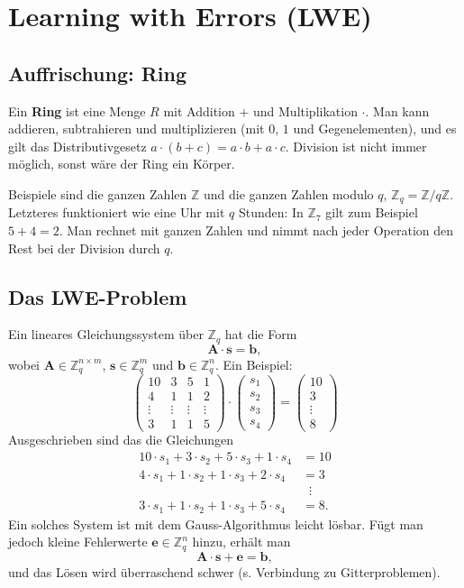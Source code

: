 \chapter{Learning with Errors (LWE)}\label{ch:lwe}

\section{Auffrischung: Ring}
Ein \textbf{Ring} ist eine Menge $R$ mit Addition $+$ und Multiplikation $\cdot$. Man kann addieren, subtrahieren und multiplizieren (mit $0$, $1$ und Gegenelementen), und es gilt das Distributivgesetz $a \cdot (b + c) = a \cdot b + a \cdot c$. Division ist nicht immer möglich, sonst wäre der Ring ein Körper.

Beispiele sind die ganzen Zahlen $\mathbb{Z}$ und die ganzen Zahlen modulo $q$, $\mathbb{Z}_q = \mathbb{Z}/q\mathbb{Z}$. Letzteres funktioniert wie eine Uhr mit $q$ Stunden: In $\mathbb{Z}_7$ gilt zum Beispiel $5 + 4 = 2$. Man rechnet mit ganzen Zahlen und nimmt nach jeder Operation den Rest bei der Division durch $q$.

\section{Das LWE-Problem}
Ein lineares Gleichungssystem über $\mathbb{Z}_q$ hat die Form
\[
    \mathbf{A} \cdot \mathbf{s} = \mathbf{b},
\]
wobei $\mathbf{A} \in \mathbb{Z}_q^{n \times m}$, $\mathbf{s} \in \mathbb{Z}_q^{m}$ und $\mathbf{b} \in \mathbb{Z}_q^{n}$. Ein Beispiel:
\[
    \begin{pmatrix}
        10 & 3 & 5 & 1 \\
        4  & 1 & 1 & 2 \\
        \vdots & \vdots & \vdots & \vdots \\
        3  & 1 & 1 & 5
    \end{pmatrix}
    \cdot
    \begin{pmatrix} s_1 \\ s_2 \\ s_3 \\ s_4 \end{pmatrix}
    =
    \begin{pmatrix} 10 \\ 3 \\ \vdots \\ 8 \end{pmatrix}
\]
Ausgeschrieben sind das die Gleichungen
\begin{align*}
    10 \cdot s_1 + 3 \cdot s_2 + 5 \cdot s_3 + 1 \cdot s_4 &= 10 \\
    4 \cdot s_1 + 1 \cdot s_2 + 1 \cdot s_3 + 2 \cdot s_4 &= 3 \\
    &\;\;\vdots \\
    3 \cdot s_1 + 1 \cdot s_2 + 1 \cdot s_3 + 5 \cdot s_4 &= 8.
\end{align*}
Ein solches System ist mit dem Gauss-Algorithmus leicht lösbar. Fügt man jedoch kleine Fehlerwerte $\mathbf{e} \in \mathbb{Z}_q^{n}$ hinzu, erhält man
\[
    \mathbf{A} \cdot \mathbf{s} + \mathbf{e} = \mathbf{b},
\]
und das Lösen wird überraschend schwer (s. Verbindung zu Gitterproblemen).


